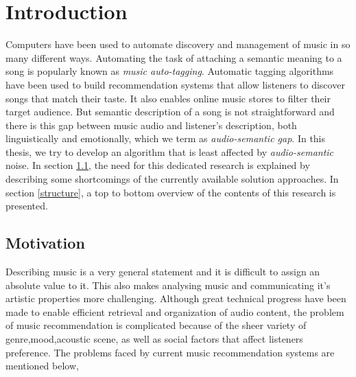 

\chapter{Introduction} %

\label{Chapter1} %


\newcommand{\keyword}[1]{\textbf{#1}}
\newcommand{\tabhead}[1]{\textbf{#1}}
\newcommand{\code}[1]{\texttt{#1}}
\newcommand{\file}[1]{\texttt{\bfseries#1}}
\newcommand{\option}[1]{\texttt{\itshape#1}}



Computers have been used to automate discovery and management of music in so many different ways. Automating the task of attaching a semantic meaning to a song is popularly known as \textit{music auto-tagging}. Automatic tagging algorithms have been used to build recommendation systems that allow listeners to discover songs that match their taste. It also enables online music stores to filter their target audience. But semantic description of a song is not straightforward and there is this gap between music audio and listener's description, both linguistically and emotionally, which we term as \textit{audio-semantic gap}. In this thesis, we try to develop an algorithm that is least affected by \textit{audio-semantic} noise. In section \ref{motivation}, the need for this dedicated research is explained by describing some shortcomings of the currently available solution approaches. In section \ref{structure}, a top to bottom overview of the contents of this research is presented.   


\section{Motivation}
\label{motivation}
Describing music is a very general statement and it is difficult to assign an absolute value to it. This also makes analysing music and communicating it's artistic properties more challenging. Although great technical progress have been made to enable efficient retrieval and organization of audio content, the problem of music recommendation is complicated because of the sheer variety of genre,mood,acoustic scene, as well as social factors that affect listeners preference. The problems faced by current music recommendation systems are mentioned below,  

